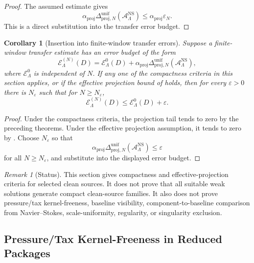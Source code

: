 \documentclass[11pt]{article}
\numberwithin{equation}{section}
\newtheorem{corollary}[corollary]{Corollary}
\theoremstyle{definition}
\theoremstyle{remark}
\newtheorem{remark}[remark]{Remark}
\newcommand{\NS}{\mathrm{NS}}
\begin{document}
\begin{proof}
The assumed estimate gives
\[
    \alpha_{\mathrm{proj}}
    \Delta_{\mathrm{proj},N}^{\mathrm{unif}}
    (\mathcal A_{\Lambda}^{\NS})
    \le
    \alpha_{\mathrm{proj}}\varepsilon_N.
\]
This is a direct substitution into the transfer error budget.
\end{proof}

\begin{corollary}[Insertion into finite-window transfer errors]
\label{cor:projection-tail-transfer-insertion}
Suppose a finite-window transfer estimate has an error budget of the form
\[
    \mathcal E_{\Lambda}^{(N)}(D)
    =
    \mathcal E_{\Lambda}^{0}(D)
    +
    \alpha_{\mathrm{proj}}
    \Delta_{\mathrm{proj},N}^{\mathrm{unif}}
    (\mathcal A_{\Lambda}^{\NS}),
\]
where \(\mathcal E_{\Lambda}^{0}\) is independent of \(N\).  If any one of the
compactness criteria in this section applies, or if the effective projection
bound of  holds, then for every
\(\varepsilon>0\) there is \(N_\varepsilon\) such that for
\(N\ge N_\varepsilon\),
\[
    \mathcal E_{\Lambda}^{(N)}(D)
    \le
    \mathcal E_{\Lambda}^{0}(D)+\varepsilon.
\]
\end{corollary}

\begin{proof}
Under the compactness criteria, the projection tail tends to zero by the
preceding theorems.  Under the effective projection assumption, it tends to zero
by .  Choose \(N_\varepsilon\) so
that
\[
    \alpha_{\mathrm{proj}}
    \Delta_{\mathrm{proj},N}^{\mathrm{unif}}
    (\mathcal A_{\Lambda}^{\NS})
    \le
    \varepsilon
\]
for all \(N\ge N_\varepsilon\), and substitute into the displayed error budget.
\end{proof}

\begin{remark}[Status]
\label{rem:clean-compactness-status}
This section gives compactness and effective-projection criteria for selected
clean sources.  It does not prove that all suitable weak solutions generate
compact clean-source families.  It also does not prove pressure/tax
kernel-freeness, baseline visibility, component-to-baseline comparison from
Navier--Stokes, scale-uniformity, regularity, or singularity exclusion.
\end{remark}

\subsection{Pressure/Tax Kernel-Freeness in Reduced Packages}
\label{sec:pressure-tax-kernel}
\end{document}
